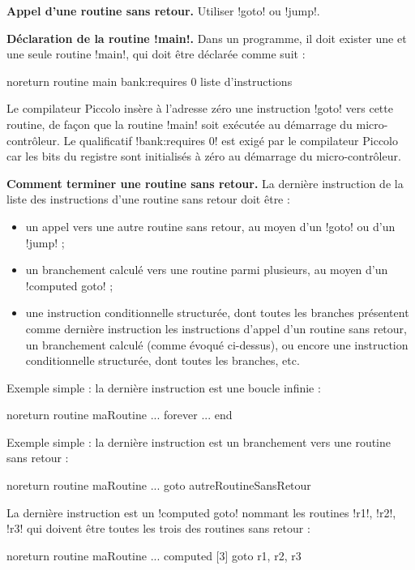 \textbf{Appel d’une routine sans retour.} Utiliser \pic!goto! ou \pic!jump!.


\textbf{Déclaration de la routine \pic!main!.} Dans un programme, il doit exister une et une seule routine \pic!main!, qui doit être déclarée comme suit :

\begin{piccolo}
noreturn routine main bank:requires 0 {
   liste d'instructions
}

\end{piccolo}

Le compilateur Piccolo insère à l’adresse zéro une instruction \pic!goto! vers cette routine, de façon que la routine \pic!main! soit exécutée au démarrage du micro-contrôleur. Le qualificatif \pic!bank:requires 0! est exigé par le compilateur Piccolo car les bits  du registre  sont initialisés à zéro au démarrage du micro-contrôleur.


\textbf{Comment terminer une routine sans retour.} La dernière instruction de la liste des instructions d’une routine sans retour doit être :
\begin{itemize}
  \item un appel vers une autre routine sans retour, au moyen d’un \pic!goto! ou d'un \pic!jump! ;
  \item un branchement calculé vers une routine parmi plusieurs, au moyen d’un \pic!computed goto! ;
  \item une instruction conditionnelle structurée, dont toutes les branches présentent comme dernière instruction les instructions d’appel d’un routine sans retour, un branchement calculé (comme évoqué ci-dessus), ou encore une instruction conditionnelle structurée, dont toutes les branches, etc.

\end{itemize}

Exemple simple : la dernière instruction est une boucle infinie :
\begin{piccolo}
noreturn routine maRoutine {
  ...
  forever
    ...
  end
}
\end{piccolo}

Exemple simple : la dernière instruction est un branchement vers une routine sans retour :
\begin{piccolo}
noreturn routine maRoutine {
  ...
  goto autreRoutineSansRetour
}
\end{piccolo}

La dernière instruction est un \pic!computed goto! nommant les routines \pic!r1!, \pic!r2!, \pic!r3! qui doivent être toutes les trois des routines sans retour :
\begin{piccolo}
noreturn routine maRoutine {
  ...
  computed [3] goto r1, r2, r3
}
\end{piccolo}

